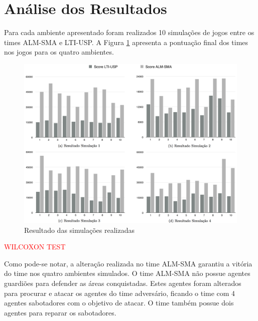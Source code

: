 \documentclass{llncs}
\begin{document}
\section{Análise dos Resultados}

Para cada ambiente apresentado foram realizados 10 simulações de jogos entre os times ALM-SMA e LTI-USP. A Figura \ref{fig:resultados} apresenta a pontuação final dos times nos jogos para os quatro ambientes.

\begin{figure}[!ht]
\centering
\includegraphics[width=1\linewidth]{./images/simulations-chart.png}
\caption{Resultado das simulações realizadas}
\label{fig:resultados}
\end{figure}

\textcolor{red}{WILCOXON TEST}

Como pode-se notar, a alteração realizada no time ALM-SMA garantiu a vitória do time nos quatro ambientes simulados. O time ALM-SMA não possue agentes guardiões para defender as áreas conquistadas. Estes agentes foram alterados para procurar e atacar os agentes do time adversário, ficando o time com 4 agentes sabotadores com o objetivo de atacar. O time também possue dois agentes para reparar os sabotadores.
\end{document}
